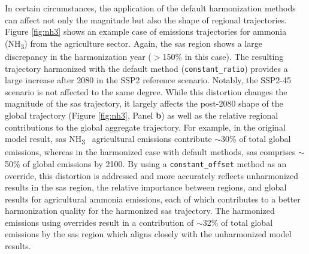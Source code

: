 \documentclass[review]{elsarticle}
\newcommand{\code}[1]{\lstinline[basicstyle=\ttfamily\color{black}]|#1|}
\newcommand{\nht}{NH\textsubscript{3}}
\begin{document}
In certain circumstances, the application of the default harmonization methods
can affect not only the magnitude but also the shape of regional
trajectories. Figure \ref{fig:nh3} shows an example case of emissions
trajectories for ammonia (\nht) from the agriculture sector. Again, the
\gls{sas} region shows a large discrepancy in the harmonization year ($>$150\%
in this case). The resulting trajectory harmonized with the default method
(\code{constant_ratio}) provides a large increase after 2080 in the SSP2
reference scenario. Notably, the SSP2-45 scenario is not affected to the same
degree. While this distortion changes the magnitude of the \gls{sas} trajectory,
it largely affects the post-2080 shape of the global trajectory (Figure
\ref{fig:nh3}, Panel \textbf{b}) as well as the relative regional contributions
to the global aggregate trajectory. For example, in the original model result,
\gls{sas} \nht~ agricultural emissions contribute $\sim$30\% of total global
emissions, whereas in the harmonized case with default methods, \gls{sas}
comprises $\sim$50\% of global emissions by 2100. By using a
\code{constant_offset} method as an override, this distortion is addressed and
more accurately reflects unharmonized results in the \gls{sas} region, the
relative importance between regions, and global results for agricultural ammonia
emissions, each of which contributes to a better harmonization quality for the
harmonized \gls{sas} trajectory. The harmonized emissions using overrides result
in a contribution of $\sim$32\% of total global emissions by the \gls{sas}
region which aligns closely with the unharmonized model results.
\end{document}
